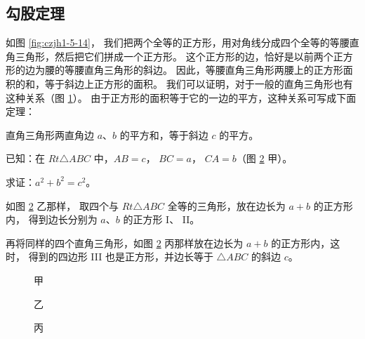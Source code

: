 \subsection{勾股定理}\label{subsec:czjh1-5-3}

如图 \ref{fig:czjh1-5-14}， 我们把两个全等的正方形，用对角线分成四个全等的等腰直角三角形，然后把它们拼成一个正方形。
这个正方形的边，恰好是以前两个正方形的边为腰的等腰直角三角形的斜边。
因此，等腰直角三角形两腰上的正方形面积的和，等于斜边上正方形的面积。
我们可以证明，对于一般的直角三角形也有这种关系（图 \ref{fig:czjh1-5-15}）。
由于正方形的面积等于它的一边的平方，这种关系可写成下面定理：

\begin{figure}[htbp]
    \centering
    \begin{minipage}[b]{7cm}
        \centering
        
        \caption{}\label{fig:czjh1-5-14}
    \end{minipage}
    \qquad
    \begin{minipage}[b]{7cm}
        \centering
        
        \caption{}\label{fig:czjh1-5-15}
    \end{minipage}
\end{figure}

\begin{dingli}[定理]
    直角三角形两直角边 $a$、$b$ 的平方和，等于斜边 $c$ 的平方。
\end{dingli}

\begin{center}
\end{center}

已知：在 $Rt \triangle ABC$ 中，$AB = c$， $BC = a$， $CA = b$（图 \ref{fig:czjh1-5-16} 甲）。

求证：$a^2 + b^2 = c^2$。

\zhengming 如图 \ref{fig:czjh1-5-16} 乙那样， 取四个与 $Rt \triangle ABC$ 全等的三角形，放在边长为 $a + b$ 的正方形内，
得到边长分别为 $a$、$b$ 的正方形 I、 II。

再将同样的四个直角三角形，如图 \ref{fig:czjh1-5-16} 丙那样放在边长为 $a + b$ 的正方形内，这时，
得到的四边形 III 也是正方形，并边长等于 $\triangle ABC$ 的斜边 $c$。

\begin{figure}[htbp]
    \centering
    \begin{minipage}[b]{3cm}
        \centering
        
        \caption*{甲}
    \end{minipage}
    \qquad
    \begin{minipage}[b]{5cm}
        \centering
        
        \caption*{乙}
    \end{minipage}
    \qquad
    \begin{minipage}[b]{5cm}
        \centering
        
        \caption*{丙}
    \end{minipage}
    \caption{}\label{fig:czjh1-5-16}
\end{figure}


